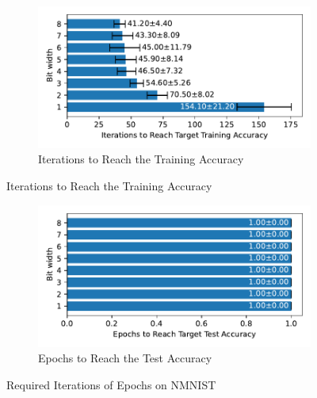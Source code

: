     \label{appendix:iterations_nmnist}
        \begin{figure}[H]
            \centering
            \begin{subfigure}[H]{\textwidth}
                \centering
                \includegraphics[width=\textwidth]{../standard/NMNIST/plots/nmnist_train_iters_horizontal.pdf}
                \caption{Iterations to Reach the Training Accuracy}
            \end{subfigure}
        \end{figure}
        \begin{figure}[H]
            \centering
            \ContinuedFloat
            \begin{subfigure}[H]{\textwidth}
                \centering
                \includegraphics[width=\textwidth]{../standard/NMNIST/plots/nmnist_test_iters_horizontal.pdf}
                \caption{Epochs to Reach the Test Accuracy}
            \end{subfigure}
            \caption{Required Iterations of Epochs on NMNIST}
        \end{figure}

